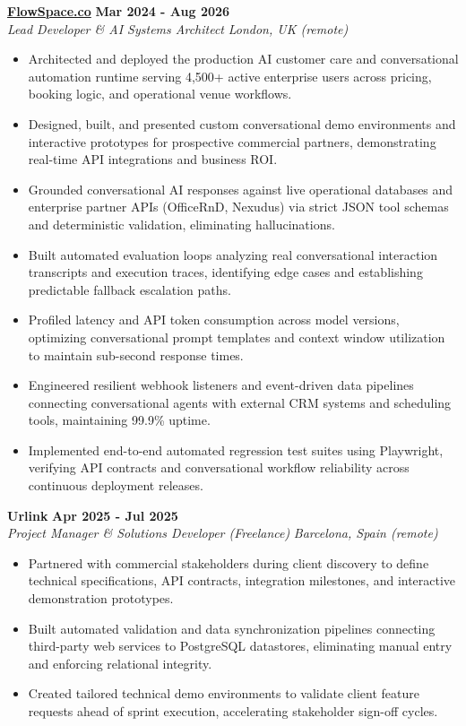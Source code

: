 \documentclass[10pt,a4paper]{article}
\newcommand{\role}[4]{%
  \textbf{#1} \hfill \textbf{#2}\\[1pt]%
  \textit{#3} \hfill \textit{#4}\\[2pt]%
}
\begin{document}
\role{\href{https://flowspace.co}{FlowSpace.co}}{Mar 2024 - Aug 2026}{Lead Developer \& AI Systems Architect}{London, UK (remote)}
\begin{itemize}
  \item Architected and deployed the production AI customer care and conversational automation runtime serving 4,500+ active enterprise users across pricing, booking logic, and operational venue workflows.
  \item Designed, built, and presented custom conversational demo environments and interactive prototypes for prospective commercial partners, demonstrating real-time API integrations and business ROI.
  \item Grounded conversational AI responses against live operational databases and enterprise partner APIs (OfficeRnD, Nexudus) via strict JSON tool schemas and deterministic validation, eliminating hallucinations.
  \item Built automated evaluation loops analyzing real conversational interaction transcripts and execution traces, identifying edge cases and establishing predictable fallback escalation paths.
  \item Profiled latency and API token consumption across model versions, optimizing conversational prompt templates and context window utilization to maintain sub-second response times.
  \item Engineered resilient webhook listeners and event-driven data pipelines connecting conversational agents with external CRM systems and scheduling tools, maintaining 99.9\% uptime.
  \item Implemented end-to-end automated regression test suites using Playwright, verifying API contracts and conversational workflow reliability across continuous deployment releases.
\end{itemize}

\role{Urlink}{Apr 2025 - Jul 2025}{Project Manager \& Solutions Developer (Freelance)}{Barcelona, Spain (remote)}
\begin{itemize}
  \item Partnered with commercial stakeholders during client discovery to define technical specifications, API contracts, integration milestones, and interactive demonstration prototypes.
  \item Built automated validation and data synchronization pipelines connecting third-party web services to PostgreSQL datastores, eliminating manual entry and enforcing relational integrity.
  \item Created tailored technical demo environments to validate client feature requests ahead of sprint execution, accelerating stakeholder sign-off cycles.
\end{itemize}
\end{document}
